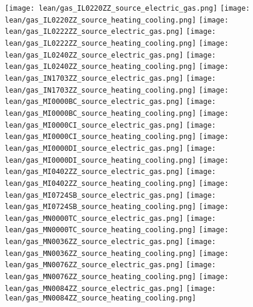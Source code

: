 \texttt{[image: lean/gas\_IL0220ZZ\_source\_electric\_gas.png]}
\texttt{[image: lean/gas\_IL0220ZZ\_source\_heating\_cooling.png]}
\texttt{[image: lean/gas\_IL0222ZZ\_source\_electric\_gas.png]}
\texttt{[image: lean/gas\_IL0222ZZ\_source\_heating\_cooling.png]}
\texttt{[image: lean/gas\_IL0240ZZ\_source\_electric\_gas.png]}
\texttt{[image: lean/gas\_IL0240ZZ\_source\_heating\_cooling.png]}
\texttt{[image: lean/gas\_IN1703ZZ\_source\_electric\_gas.png]}
\texttt{[image: lean/gas\_IN1703ZZ\_source\_heating\_cooling.png]}
\texttt{[image: lean/gas\_MI0000BC\_source\_electric\_gas.png]}
\texttt{[image: lean/gas\_MI0000BC\_source\_heating\_cooling.png]}
\texttt{[image: lean/gas\_MI0000CI\_source\_electric\_gas.png]}
\texttt{[image: lean/gas\_MI0000CI\_source\_heating\_cooling.png]}
\texttt{[image: lean/gas\_MI0000DI\_source\_electric\_gas.png]}
\texttt{[image: lean/gas\_MI0000DI\_source\_heating\_cooling.png]}
\texttt{[image: lean/gas\_MI0402ZZ\_source\_electric\_gas.png]}
\texttt{[image: lean/gas\_MI0402ZZ\_source\_heating\_cooling.png]}
\texttt{[image: lean/gas\_MI0724SB\_source\_electric\_gas.png]}
\texttt{[image: lean/gas\_MI0724SB\_source\_heating\_cooling.png]}
\texttt{[image: lean/gas\_MN0000TC\_source\_electric\_gas.png]}
\texttt{[image: lean/gas\_MN0000TC\_source\_heating\_cooling.png]}
\texttt{[image: lean/gas\_MN0036ZZ\_source\_electric\_gas.png]}
\texttt{[image: lean/gas\_MN0036ZZ\_source\_heating\_cooling.png]}
\texttt{[image: lean/gas\_MN0076ZZ\_source\_electric\_gas.png]}
\texttt{[image: lean/gas\_MN0076ZZ\_source\_heating\_cooling.png]}
\texttt{[image: lean/gas\_MN0084ZZ\_source\_electric\_gas.png]}
\texttt{[image: lean/gas\_MN0084ZZ\_source\_heating\_cooling.png]}
